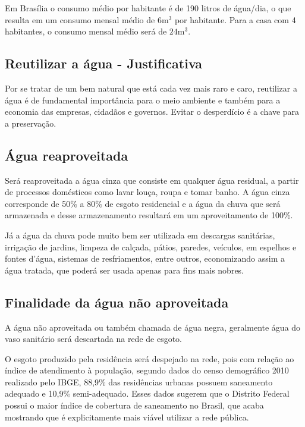 	Em Brasília o consumo médio por habitante é de 190 litros de água/dia, o que resulta em um consumo mensal médio de $6\si{\meter}^3$ por habitante. Para a casa com 4 habitantes, o consumo mensal médio será de $24\si{\meter}^3$. 

\subsection{Reutilizar a água - Justificativa}

	Por se tratar de um bem natural que está cada vez mais raro e caro, reutilizar a água é de fundamental importância para o meio ambiente e também para a economia das empresas, cidadãos e governos. Evitar o desperdício é a chave para a preservação.

\subsection{Água reaproveitada}

	Será reaproveitada a água cinza que consiste em qualquer água residual, a partir de processos domésticos como lavar louça, roupa e tomar banho. A água cinza corresponde de 50\% a 80\% de esgoto residencial e a água da chuva que será armazenada e desse armazenamento resultará em um aproveitamento de 100\%.

	Já a água da chuva pode muito bem ser utilizada em descargas sanitárias, irrigação de jardins, limpeza de calçada, pátios, paredes, veículos, em espelhos e fontes d’água, sistemas de resfriamentos, entre outros, economizando assim a água tratada, que poderá ser usada apenas para fins mais nobres.

\subsection{Finalidade da água não aproveitada}

	A água não aproveitada ou também chamada de água negra, geralmente água do vaso sanitário será descartada na rede de esgoto.

	O esgoto produzido pela residência será despejado na rede, pois com relação ao índice de atendimento à população, segundo dados do censo demográfico 2010 realizado pelo IBGE, 88,9\% das residências urbanas possuem saneamento adequado e 10,9\% semi-adequado. Esses dados sugerem que o Distrito Federal possui o maior índice de cobertura de saneamento no Brasil, que acaba mostrando que é explicitamente mais viável utilizar a rede pública.

